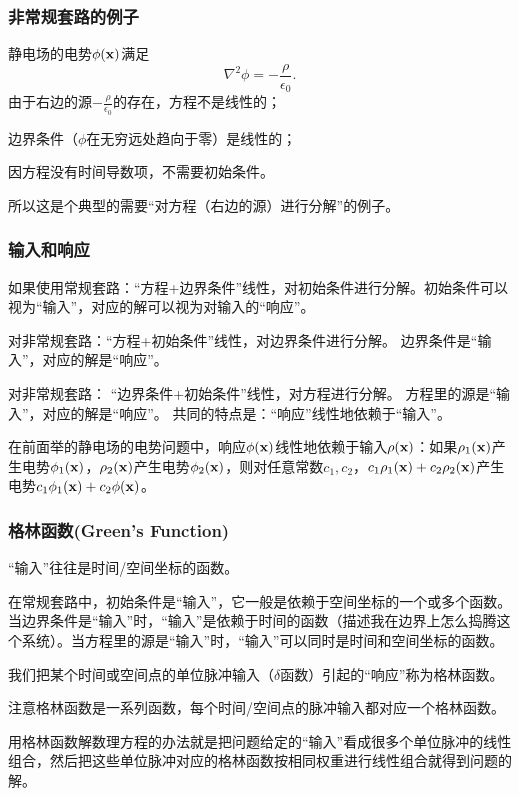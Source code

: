 \documentclass[CJK]{beamer}
\begin{document}
\begin{frame}
  \frametitle{非常规套路的例子}
  静电场的电势$\phi({\mathbf{x}})$满足
  $$\nabla^2\phi = -\frac{\rho}{\epsilon_0}.$$
  由于右边的源$-\frac{\rho}{\epsilon_0}$的存在，方程不是线性的；
  
  边界条件（$\phi$在无穷远处趋向于零）是线性的；

  因方程没有时间导数项，不需要初始条件。

  \skiplines
  
  所以这是个典型的需要“对方程（右边的源）进行分解”的例子。
\end{frame}  



\begin{frame}
  \frametitle{输入和响应}
  \bitem
\item{如果使用常规套路：{\blue “方程+边界条件”线性，对初始条件进行分解。}初始条件可以视为“输入”，对应的解可以视为对输入的“响应”。}
\item{对非常规套路：{\blue “方程+初始条件”线性，对边界条件进行分解。} 边界条件是“输入”，对应的解是“响应”。}
\item{对非常规套路： {\blue “边界条件+初始条件”线性，对方程进行分解。} 方程里的源是“输入”，对应的解是“响应”。}
  \eitem
  共同的特点是：“响应”线性地依赖于“输入”。

  \skipline
{\scriptsize  在前面举的静电场的电势问题中，响应$\phi({\mathbf{x}})$线性地依赖于输入$\rho({\mathbf{x}})$：如果$\rho_1({\mathbf{x}})$产生电势$\phi_1({\mathbf{x}})$，$\rho_2({\mathbf{x}})$产生电势$\phi_2({\mathbf{x}})$，则对任意常数$c_1,c_2$，$c_1\rho_1({\mathbf{x}})+c_2\rho_2({\mathbf{x}})$产生电势$c_1\phi_1({\mathbf{x}})+c_2\phi({\mathbf{x}})$。}
\end{frame}  


\begin{frame}
  \frametitle{格林函数(Green's Function)}
  
  “输入”往往是时间/空间坐标的函数。

  {\scriptsize 在常规套路中，初始条件是“输入”，它一般是依赖于空间坐标的一个或多个函数。当边界条件是“输入”时，“输入”是依赖于时间的函数（描述我在边界上怎么捣腾这个系统）。当方程里的源是“输入”时，“输入”可以同时是时间和空间坐标的函数。}

  \skiplines

  我们把{\blue 某个时间或空间点的单位脉冲输入（$\delta$函数）引起的“响应”称为格林函数}。

  {\scriptsize 注意格林函数是一系列函数，每个时间/空间点的脉冲输入都对应一个格林函数。}

  \skiplines
  
  用格林函数解数理方程的办法就是{\blue 把问题给定的“输入”看成很多个单位脉冲的线性组合，然后把这些单位脉冲对应的格林函数按相同权重进行线性组合就得到问题的解。}
\end{frame}
\end{document}
